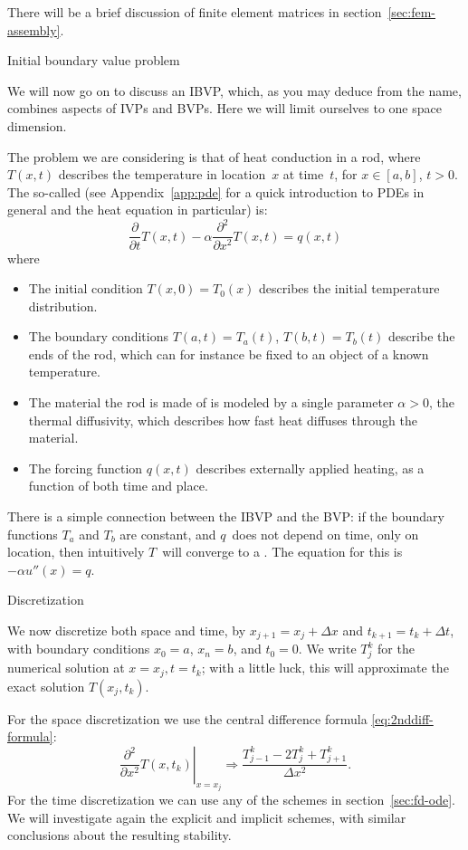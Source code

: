 There will be a brief discussion of finite element matrices in
section~\ref{sec:fem-assembly}.


 {Initial boundary value problem}
\label{sec:heateq}

We will now go on to discuss an \acf{IBVP}, which, as you may deduce
from the name, combines aspects of \ac{IVP}s and \ac{BVP}s. Here we
will limit ourselves to one space dimension.

The problem we are considering is that of  heat conduction in a rod, where
$T(x,t)$ describes the temperature in location~$x$ at time~$t$, for
$x\in[a,b]$, $t>0$. The so-called  (see
Appendix~\ref{app:pde} for a quick introduction to \acp{PDE} in
general and the heat equation in particular) is:
\[
  \frac\partial{\partial t}T(x,t)-\alpha\frac{\partial^2}{\partial x^2}T(x,t)
  =q(x,t) 
\]
where
\begin{itemize}
\item The initial condition $T(x,0)=T_0(x)$ describes the initial
  temperature distribution.
\item The boundary conditions $T(a,t)=T_a(t)$, $T(b,t)=T_b(t)$
  describe the ends of the rod, which can for instance be fixed to an
  object of a known temperature.
\item The material the rod is made of is modeled by a single parameter
  $\alpha>0$, the thermal diffusivity, which describes how fast heat
  diffuses through the material.
\item The forcing function $q(x,t)$ describes externally applied
  heating, as a function of both time and place.
\end{itemize}
There is a simple connection between the \ac{IBVP} and the \ac{BVP}:
if the boundary functions $T_a$ and $T_b$ are constant, and $q$~does
not depend on time, only on location, then intuitively $T$~will
converge to a . 
The equation for this is $-\alpha u''(x)=q$.

\def\fr{\frac{\alpha\Delta t}{\Delta x^2}}

 {Discretization}

We now discretize both space and time, by $x_{j+1}=x_j+\Delta x$ and
$t_{k+1}=t_k+\Delta t$, with boundary conditions $x_0=a$, $x_n=b$, 
and $t_0=0$. We write $T^k_j$ for the numerical solution at $x=x_j,t=t_k$;
with a little luck, this will approximate the exact
solution $T(x_j,t_k)$.

For the space discretization we use the central difference formula
\eqref{eq:2nddiff-formula}:
\[ 
  \left.\frac{\partial^2}{\partial x^2}T(x,t_k)\right|_{x=x_j} 
  \Rightarrow
  \frac{T_{j-1}^k-2T_j^k+T_{j+1}^k}{\Delta x^2}.
\]
For the time discretization we can use any of the schemes in
section~\ref{sec:fd-ode}. We will investigate again the explicit and
implicit schemes, with similar conclusions about the
resulting stability.

